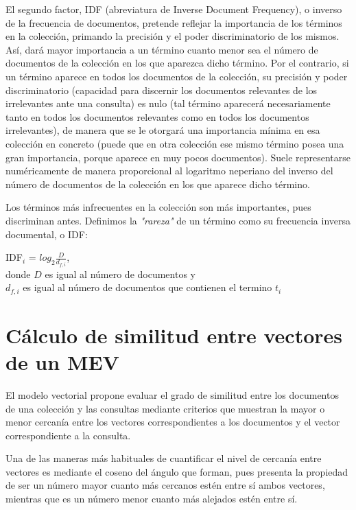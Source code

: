\documentclass[titlepage]{article}
\begin{document}
El segundo factor, IDF (abreviatura de Inverse Document Frequency), o inverso de la frecuencia de documentos, pretende reflejar la importancia de los términos en la colección, primando la precisión y el poder discriminatorio de los mismos. Así, dará mayor importancia a un término cuanto menor sea el número de documentos de la colección en los que aparezca dicho término. Por el contrario, si un término aparece en todos los documentos de la colección, su precisión y poder discriminatorio (capacidad para discernir los documentos relevantes de los irrelevantes ante una consulta) es nulo (tal término aparecerá necesariamente tanto en todos los documentos relevantes como en todos los documentos irrelevantes), de manera que se le otorgará una importancia mínima en esa colección en concreto (puede que en otra colección ese mismo término posea una gran importancia, porque aparece en muy pocos documentos). Suele representarse numéricamente de manera proporcional al logaritmo neperiano del inverso del número de documentos de la colección en los que aparece dicho término.

Los términos más infrecuentes en la colección son más importantes, pues discriminan antes. Definimos la \textit{"rareza"} de un término como su frecuencia inversa documental, o IDF:

\begin{center}
	IDF$_{i}$ = $log_{2} \frac{D}{d_{f, i}}$, \\
	donde $D$ es igual al número de documentos y \\ 
	$d_{f, i}$ es igual al número de documentos que contienen el termino $t_{i}$
\end{center}

\section{Cálculo de similitud entre vectores de un MEV}

El modelo vectorial propone evaluar el grado de similitud entre los documentos de una colección y las consultas mediante criterios que muestran la mayor o menor cercanía entre los vectores correspondientes a los documentos y el vector correspondiente a la consulta. 

Una de las maneras más habituales de cuantificar el nivel de cercanía entre vectores es mediante el coseno del ángulo que forman, pues presenta la propiedad de ser un número mayor cuanto más cercanos estén entre sí ambos vectores, mientras que es un número menor cuanto más alejados estén entre sí.
\end{document}
